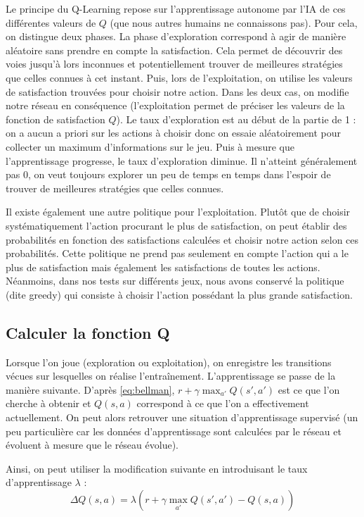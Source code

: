 Le principe du Q-Learning repose sur l'apprentissage autonome par l'IA de ces différentes valeurs de $Q$ (que nous autres humains ne connaissons pas). 
Pour cela, on distingue deux phases.
La phase d'exploration correspond à agir de manière aléatoire sans prendre en compte la satisfaction. Cela permet de découvrir des voies jusqu'à lors inconnues et 
potentiellement trouver de meilleures stratégies que celles connues à cet instant. Puis, lors de l'exploitation, on utilise les valeurs de satisfaction trouvées
pour choisir notre action. Dans les deux cas, on modifie notre réseau en conséquence (l'exploitation permet de préciser les valeurs de la fonction de satisfaction $Q$).
Le taux d'exploration est au début de la partie de 1 : on a aucun a priori sur les actions à choisir donc on essaie aléatoirement pour collecter un maximum d'informations
sur le jeu. Puis à mesure que l'apprentissage progresse, le taux d'exploration diminue. Il n'atteint généralement pas 0, on veut toujours explorer un peu de temps en temps
dans l'espoir de trouver de meilleures stratégies que celles connues. 

Il existe également une autre politique pour l'exploitation. Plutôt que de choisir systématiquement l'action procurant le plus de satisfaction, on peut
établir des probabilités en fonction des satisfactions calculées et choisir notre action selon ces probabilités. Cette politique ne prend pas seulement en compte
l'action qui a le plus de satisfaction mais également les satisfactions de toutes les actions. Néanmoins, dans nos tests sur différents jeux, nous avons conservé
la politique (dite greedy) qui consiste à choisir l'action possédant la plus grande satisfaction.

\subsection{Calculer la fonction Q}

Lorsque l'on joue (exploration ou exploitation), on enregistre les transitions vécues sur lesquelles on réalise l'entraînement. L'apprentissage se passe de la manière
suivante. D'après \ref{eq:bellman}, $r + \gamma \max_{a'} Q\left(s',a'\right)$ est ce que l'on cherche à obtenir et $Q\left(s,a\right)$ correspond à ce que l'on
a effectivement actuellement. On peut alors retrouver une situation d'apprentissage supervisé (un peu particulière car les données d'apprentissage sont calculées par 
le réseau et évoluent à mesure que le réseau évolue).

Ainsi, on peut utiliser la modification suivante en introduisant le taux d'apprentissage $\lambda$ : 
\begin{equation}
 \Delta Q\left(s,a\right) = \lambda\left(r + \gamma \max_{a'} Q\left(s',a'\right) - Q\left(s,a\right)\right)
 \label{eq:modif-bellman}
\end{equation}

